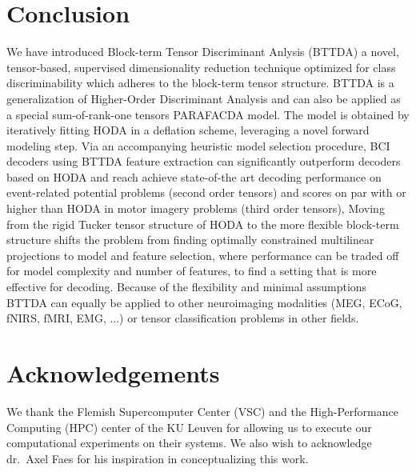 \documentclass[twocolumn]{article}
\begin{document}
\section{Conclusion}
We have introduced Block-term Tensor Discriminant Anlysis (BTTDA) a novel,
tensor-based, supervised dimensionality reduction technique optimized for class
discriminability which adheres to the block-term tensor structure.
BTTDA is a generalization of Higher-Order Discriminant Analysis and can also be
applied as a special sum-of-rank-one tensors PARAFACDA model.
The model is obtained by iteratively fitting HODA in a deflation scheme,
leveraging a novel forward modeling step.
Via an accompanying heuristic model selection procedure, BCI decoders using BTTDA
feature extraction can significantly outperform decoders based on HODA and
reach achieve state-of-the art decoding performance on event-related potential
problems (second order tensors) and scores on par with or higher than HODA  in motor
imagery problems (third order tensors),
Moving from the rigid Tucker tensor structure of HODA to the more flexible
block-term structure shifts the problem from finding optimally constrained multilinear
projections to model and feature selection, where performance can be traded
off for model complexity and number of features, to find a setting that is more
effective for decoding.
Because of the flexibility and minimal assumptions BTTDA
can equally be applied to other neuroimaging modalities (MEG, ECoG, fNIRS,
fMRI, EMG, ...) or tensor classification problems in other fields.

\section*{Acknowledgements}
We thank the Flemish Supercomputer Center (VSC) and the High-Performance
Computing (HPC) center of the KU Leuven for allowing us to execute our
computational experiments on their systems.
We also wish to acknowledge dr.\ Axel Faes for his inspiration in conceptualizing this
work.

\printbibliography
\end{document}
